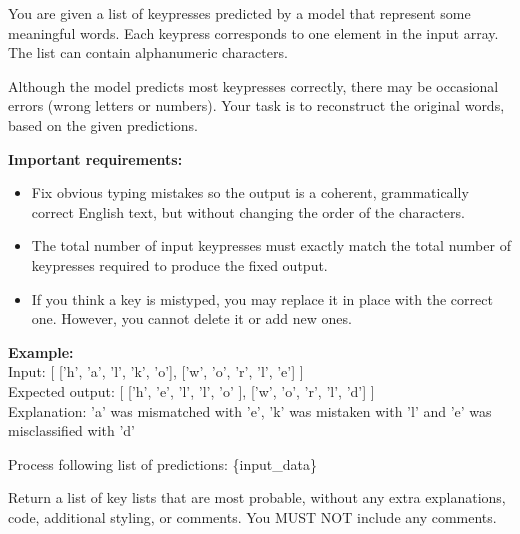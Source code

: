 \documentclass[a4paper,11pt,twoside]{report}
\theoremstyle{definition}
\begin{document}
\begin{tcolorbox}[colback=white!5,colframe=gray!20,title=Prompt to reconstruct the words using alphanumeric keys,coltitle=black]
You are given a list of keypresses predicted by a model that represent some meaningful words.
Each keypress corresponds to one element in the input array. The list can contain alphanumeric characters.

Although the model predicts most keypresses correctly, there may be occasional errors (wrong letters or numbers).
Your task is to reconstruct the original words, based on the given predictions.

\textbf{Important requirements:}
\begin{itemize}
  \item Fix obvious typing mistakes so the output is a coherent, grammatically correct English text, but without changing the order of the characters.
  \item The total number of input keypresses must exactly match the total number of keypresses required to produce the fixed output.
  \item If you think a key is mistyped, you may replace it in place with the correct one. However, you cannot delete it or add new ones.
\end{itemize}

\textbf{Example:} \\
Input: [ ['h', 'a', 'l', 'k', 'o'], ['w', 'o', 'r', 'l', 'e'] ] \\
Expected output: [ ['h', 'e', 'l', 'l', 'o' ], ['w', 'o', 'r', 'l', 'd'] ] \\
Explanation: 'a' was mismatched with 'e', 'k' was mistaken with 'l' and 'e' was misclassified with 'd'

Process following list of predictions: \{input\_data\}

Return a list of key lists that are most probable, without any extra explanations, code, additional styling, or comments. You MUST NOT include any comments.
\end{tcolorbox}
\end{document}
